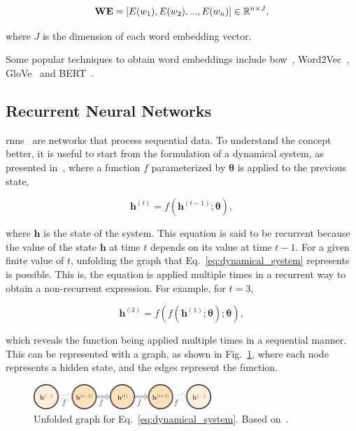 \begin{equation}
    \mathbf{WE} = [E(w_1), E(w_2), ..., E(w_n)] \in \mathbb{R} ^ {n \times J},
\end{equation}

where $J$ is the dimension of each word embedding vector. 

Some popular techniques to obtain word embeddings include \gls{bow}~\cite{sivic2008efficient}, Word2Vec~\cite{mikolov2013efficient}, GloVe~\cite{pennington2014glove} and BERT~\cite{devlin2018bert}.

\subsection{Recurrent Neural Networks}

\glspl{rnn}~\cite{rumelhart1986learning} are networks that process sequential data. To understand the concept better, it is useful to start from the formulation of a dynamical system, as presented in~\cite{goodfellow2016deep}, where a function $f$ parameterized by $\bm{\theta}$ is applied to the previous state,

\begin{equation}
    \mathbf{h}^{(t)} = f(\mathbf{h}^{(t-1)}; \bm{\theta}),
    \label{eq:dynamical_system}
\end{equation}

where $\mathbf{h}$ is the state of the system. This equation is said to be recurrent because the value of the state $\mathbf{h}$ at time $t$ depends on its value at time $t-1$. For a given finite value of $t$, unfolding the graph that Eq.~\eqref{eq:dynamical_system} represents is possible. This is, the equation is applied multiple times in a recurrent way to obtain a non-recurrent expression. For example, for $t=3$,

\begin{equation}
    \mathbf{h}^{(3)} = f(f(\bm{h}^{(1)}; \bm{\theta}); \bm{\theta}),
\end{equation}

which reveals the function being applied multiple times in a sequential manner. This can be represented with a graph, as shown in Fig.~\ref{fig:unfolded_graph}, where each node represents a hidden state, and the edges represent the function. 

\begin{figure}[!ht]
\begin{center}
\includegraphics[width=0.60\textwidth]{Figures/Background/unfolded_graph.pdf}
\caption{Unfolded graph for Eq.~\eqref{eq:dynamical_system}. Based on~\cite{goodfellow2016deep}.}
\label{fig:unfolded_graph}
\end{center}
\end{figure}

